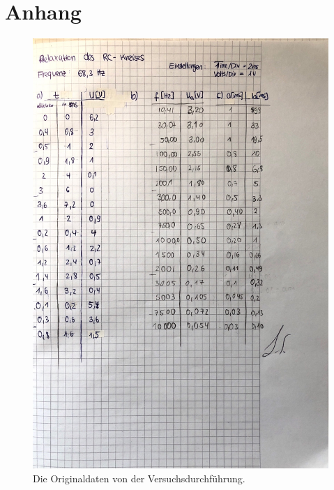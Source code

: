 \section{Anhang}
\begin{figure}
    \centering
    \includegraphics[width=\textwidth]{bilder/daten_V353.pdf}
    \caption{Die Originaldaten von der Versuchsdurchführung.}
\end{figure}